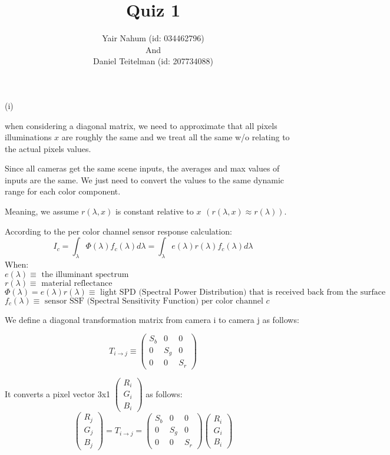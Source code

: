 \documentclass{homework}
\title{Quiz 1}
\author{Yair Nahum (id: 034462796)\\And\\Daniel Teitelman (id: 207734088)}
\begin{document}
\maketitle


(i) 

when considering a diagonal matrix, we need to approximate that all pixels illuminations $x$ are roughly the same and we treat all the same w/o relating to the actual pixels values.

Since all cameras get the same scene inputs, the averages and max values of inputs are the same. We just need to convert the values to the same dynamic range for each color component.

Meaning, we assume $r(\lambda , x)$ is constant relative to $x \hspace{5pt} ( r(\lambda,x)\approx r(\lambda) )$.

According to the per color channel sensor response calculation:
$$I_c=\int_{\lambda} \Phi(\lambda)f_c(\lambda)d\lambda=\int_{\lambda} e(\lambda)r(\lambda)f_c(\lambda)d\lambda$$
When:\\
$e(\lambda) \equiv \text{ the illuminant spectrum} $\\
$r(\lambda) \equiv \text{ material reflectance} $\\
$\Phi(\lambda) = e(\lambda)r(\lambda) \equiv \text{ light SPD (Spectral Power Distribution) that is received back from the surface} $\\
$f_c(\lambda) \equiv \text{ sensor SSF (Spectral Sensitivity Function) per color channel } c$

We define a diagonal transformation matrix from camera i to camera j as follows:

$$T_{i\rightarrow j} \equiv
\begin{pmatrix} 
    S_b & 0 & 0 \\ 
    0 & S_g & 0 \\ 
    0 & 0 & S_r 
\end{pmatrix}$$

It converts a pixel vector 3x1 $\begin{pmatrix} R_i\\G_i\\B_i \end{pmatrix}$ as follows:
$$\begin{pmatrix} R_j\\G_j\\B_j \end{pmatrix} = T_{i\rightarrow j}=
\begin{pmatrix} 
    S_b & 0 & 0 \\ 
    0 & S_g & 0 \\ 
    0 & 0 & S_r 
\end{pmatrix}\begin{pmatrix} R_i\\G_i\\B_i \end{pmatrix}$$
\end{document}
